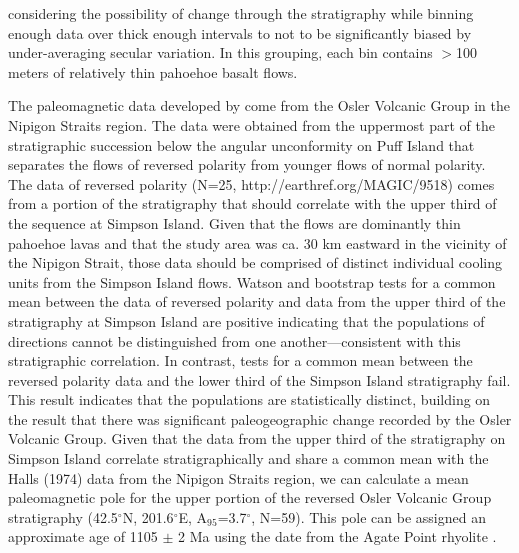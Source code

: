 \documentclass[draft,gc]{AGUTeX}
\begin{document}
\begin{article}
considering the possibility of change through the stratigraphy while binning enough data over thick enough intervals to not to be significantly biased by under-averaging secular variation. In this grouping, each bin contains $>$100 meters of relatively thin pahoehoe basalt flows.

The paleomagnetic data developed by \citet{Halls1974a} come from the Osler Volcanic Group in the Nipigon Straits region. The data were obtained from the uppermost part of the stratigraphic succession below the angular unconformity on Puff Island that separates the flows of reversed polarity from younger flows of normal polarity. The \citet{Halls1974a} data of reversed polarity (N=25,  http://earthref.org/MAGIC/9518) comes from a portion of the stratigraphy that should correlate with the upper third of the sequence at Simpson Island. Given that the flows are dominantly thin pahoehoe lavas and that the \citet{Halls1974a} study area was ca. 30 km eastward in the vicinity of the Nipigon Strait, those data should be comprised of distinct individual cooling units from the Simpson Island flows. Watson and bootstrap tests for a common mean between the \citet{Halls1974a} data of reversed polarity and data from the upper third of the stratigraphy at Simpson Island are positive indicating that the populations of directions cannot be distinguished from one another---consistent with this stratigraphic correlation. In contrast, tests for a common mean between the reversed polarity \citet{Halls1974a} data and the lower third of the Simpson Island stratigraphy fail. This result indicates that the populations are statistically distinct, building on the result that there was significant paleogeographic change recorded by the Osler Volcanic Group. Given that the data from the upper third of the stratigraphy on Simpson Island correlate stratigraphically and share a common mean with the Halls (1974) data from the Nipigon Straits region, we can calculate a mean paleomagnetic pole for the upper portion of the reversed Osler Volcanic Group stratigraphy (42.5$^\circ$N, 201.6$^\circ$E, A$_{95}$=3.7$^\circ$, N=59). This pole can be assigned an approximate age of 1105 $\pm$ 2 Ma using the date from the Agate Point rhyolite \citep{Davis1997a}.


\end{article}
\end{document}
